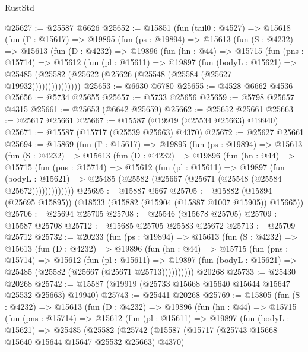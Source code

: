 \begin{lexlean}{RustStd}
\begin{coremodule}
@25627 := @25587 @6626
@25652 := @15851
    (fun (tail0 : @4527) =>
    @15618
      (fun (Γ : @15617) =>
      @19895
        (fun (ps : @19894) =>
        @15613
          (fun (S : @4232) =>
          @15613
            (fun (D : @4232) =>
            @19896
              (fun (hn : @44) =>
              @15715
                (fun (pns : @15714) =>
                @15612
                  (fun (pl : @15611) =>
                  @19897
                    (fun (bodyL : @15621) =>
                    @25485 (@25582 (@25622 (@25626 (@25548 (@25584 (@25627 @19932)))))))))))))))
@25653 := @6630 @6780
@25655 := @4528 @6662 @4536
@25656 := @5734 @25655
@25657 := @5733 @25656
@25659 := @5798 @25657 @4315
@25661 := @25653 (@6642 @25659)
@25662 := @25652 @25661
@25663 := @25617 @25661
@25667 := @15587 (@19919 (@25534 @25663) @19940)
@25671 := @15587 (@15717 (@25539 @25663) @4370)
@25672 := @25627 @25661
@25694 := @15869
    (fun (Γ : @15617) =>
    @19895
      (fun (ps : @19894) =>
      @15613
        (fun (S : @4232) =>
        @15613
          (fun (D : @4232) =>
          @19896
            (fun (hn : @44) =>
            @15715
              (fun (pns : @15714) =>
              @15612
                (fun (pl : @15611) =>
                @19897
                  (fun (bodyL : @15621) =>
                  @25485 (@25582 (@25667 (@25671 (@25548 (@25584 @25672)))))))))))))
@25695 := @15887 @667
@25705 := @15882 (@15894 (@25695 @15895)) (@18533 (@15882 (@15904 (@15887 @1007 @15905)) @15665))
@25706 := @25694 @25705
@25708 := @25546 (@15678 @25705)
@25709 := @15587 @25708
@25712 := @15685 @25705 @25583 @25672
@25713 := @25709 @25712
@25732 := @20233
    (fun (ps : @19894) =>
    @15613
      (fun (S : @4232) =>
      @15613
        (fun (D : @4232) =>
        @19896
          (fun (hn : @44) =>
          @15715
            (fun (pns : @15714) =>
            @15612
              (fun (pl : @15611) =>
              @19897 (fun (bodyL : @15621) => @25485 (@25582 (@25667 (@25671 @25713))))))))))
    @20268
@25733 := @25430 @20268
@25742 := @15587 (@19919 (@25733 @15668 @15640 @15644 @15647 @25532 @25663) @19940)
@25743 := @25441 @20268
@25769 := @15805
    (fun (S : @4232) =>
    @15613
      (fun (D : @4232) =>
      @19896
        (fun (hn : @44) =>
        @15715
          (fun (pns : @15714) =>
          @15612
            (fun (pl : @15611) =>
            @19897
              (fun (bodyL : @15621) =>
              @25485
                (@25582
                  (@25742
                    (@15587
                      (@15717 (@25743 @15668 @15640 @15644 @15647 @25532 @25663) @4370)

\end{coremodule}
\end{lexlean}
